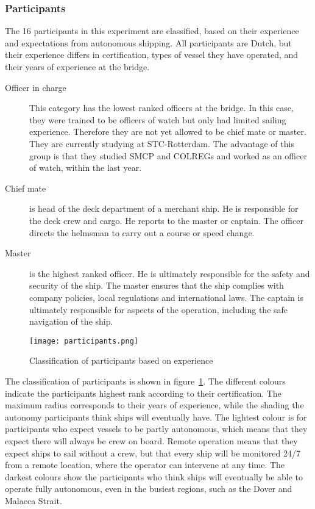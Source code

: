\subsubsection{Participants}
The 16 participants in this experiment are classified, based on their experience and expectations from autonomous shipping. All participants are Dutch, but their experience differs in certification, types of vessel they have operated, and their years of experience at the bridge.
\begin{description}
	\item[Officer in charge] This category has the lowest ranked officers at the bridge. In this case, they were trained to be officers of watch but only had limited sailing experience. Therefore they are not yet allowed to be chief mate or master. They are currently studying at STC-Rotterdam. The advantage of this group is that they studied SMCP and COLREGs and worked as an officer of watch, within the last year.
	\item[Chief mate] is head of the deck department of a merchant ship. He is responsible for the deck crew and cargo. He reports to the master or captain. The officer directs the helmsman to carry out a course or speed change.
	\item[Master] is the highest ranked officer. He is ultimately responsible for the safety and security of the ship. The master ensures that the ship complies with company policies, local regulations and international laws. The captain is ultimately responsible for aspects of the operation, including the safe navigation of the ship.
\end{description}

\begin{figure}[h]
	\centering
	\texttt{[image: participants.png]}
	\caption{Classification of participants based on experience}
	\label{fig:participants}
\end{figure}

The classification of participants is shown in figure~\ref{fig:participants}. The different colours indicate the participants highest rank according to their certification. The maximum radius corresponds to their years of experience, while the shading the autonomy participants think ships will eventually have. 
The lightest colour is for participants who expect vessels to be partly autonomous, which means that they expect there will always be crew on board. Remote operation means that they expect ships to sail without a crew, but that every ship will be monitored 24/7 from a remote location, where the operator can intervene at any time. The darkest colours show the participants who think ships will eventually be able to operate fully autonomous, even in the busiest regions, such as the Dover and Malacca Strait.

